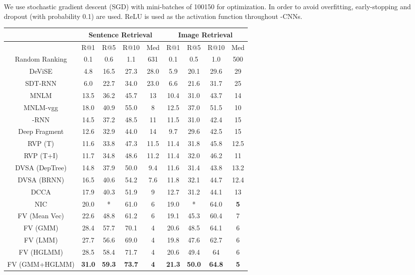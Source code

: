 \documentclass[10pt,twocolumn,letterpaper]{article}
\begin{document}
We use stochastic gradient descent (SGD) with mini-batches of 100150 for optimization.
In order to avoid overfitting, early-stopping \cite{caruana_nips2000} and dropout (with probability 0.1) \cite{hinton_corr2012} are used. ReLU is used as the activation function throughout -CNNs.






\begin{table*} \small
\begin{center}
\begin{tabular}{c|cccc|cccc}
    \hline
          & \multicolumn{4}{|c|}{Sentence Retrieval} & \multicolumn{4}{|c}{Image Retrieval}  \\
          \hline
          \hline
        & R@1 & R@5 & R@10 & Med  & R@1 & R@5 & R@10 & Med  \\
        \hline
        \hline
        Random Ranking & 0.1 & 0.6 & 1.1 & 631 & 0.1 & 0.5  & 1.0 & 500\\
DeViSE \cite{frome_nips2013}& 4.8 & 16.5 & 27.3 & 28.0 & 5.9 & 20.1  & 29.6 & 29\\
SDT-RNN \cite{socher_tacl2014}& 6.0 & 22.7 & 34.0 & 23.0 & 6.6 & 21.6  & 31.7 & 25\\
MNLM \cite{kiros_2014}& 13.5 & 36.2 & 45.7 & 13 & 10.4 & 31.0  & 43.7 & 14\\
MNLM-vgg \cite{kiros_2014}& 18.0 & 40.9 & 55.0 & 8 & 12.5 & 37.0  & 51.5 & 10\\
-RNN \cite{mao_2014}& 14.5 & 37.2 & 48.5 & 11 & 11.5 & 31.0  & 42.4 & 15\\
Deep Fragment  \cite{karpathy_2014} & 12.6 & 32.9 & 44.0 &14 & 9.7 & 29.6  & 42.5 & 15\\
RVP (T) \cite{chen_2014}& 11.6 & 33.8 & 47.3 & 11.5 & 11.4 & 31.8  & 45.8 & 12.5\\
RVP (T+I) \cite{chen_2014}& 11.7 & 34.8 & 48.6 & 11.2 & 11.4 & 32.0  & 46.2 & 11\\
DVSA (DepTree) \cite{karpathy_dvsa_2014}& 14.8 & 37.9 & 50.0 & 9.4 & 11.6 & 31.4  & 43.8 & 13.2\\
DVSA (BRNN) \cite{karpathy_dvsa_2014}& 16.5 & 40.6 & 54.2 & 7.6 & 11.8 & 32.1  & 44.7 & 12.4\\
DCCA \cite{yan_cvpr2015} & 17.9 & 40.3 & 51.9 & 9 & 12.7 & 31.2 & 44.1 & 13\\
NIC \cite{vinyals_2014}& {20.0} & * & {61.0} & {6} & {19.0} & *  & {64.0} & \textbf{5}\\

        FV (Mean Vec) \cite{klein_cvpr2015} & 22.6 & 48.8 & 61.2 & 6 & 19.1 & 45.3 & 60.4 & 7 \\
        FV (GMM) \cite{klein_cvpr2015} & 28.4 & 57.7 & 70.1 & 4 & 20.6 & 48.5 & 64.1 & 6 \\
        FV (LMM) \cite{klein_cvpr2015} & 27.7 & 56.6 & 69.0 & 4 & 19.8 & 47.6 & 62.7 & 6 \\
        FV (HGLMM) \cite{klein_cvpr2015} & 28.5 & 58.4 & 71.7 & 4 & 20.6 & 49.4 & 64 & 6 \\
        FV (GMM+HGLMM) \cite{klein_cvpr2015} & \textbf{31.0} & \textbf{59.3} & \textbf{73.7} & \textbf{4} & \textbf{21.3} & \textbf{50.0} & \textbf{64.8} & \textbf{5} \\


\end{tabular}
\end{center}
\end{table*}
\end{document}
